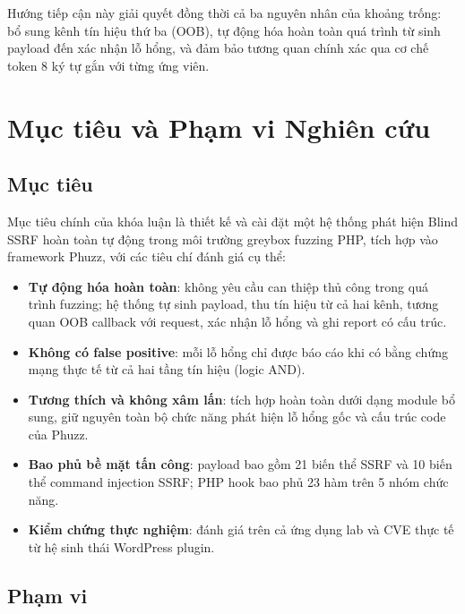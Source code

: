 Hướng tiếp cận này giải quyết đồng thời cả ba nguyên nhân của khoảng trống: bổ sung
kênh tín hiệu thứ ba (OOB), tự động hóa hoàn toàn quá trình từ sinh payload đến xác
nhận lỗ hổng, và đảm bảo tương quan chính xác qua cơ chế token 8 ký tự gắn với từng
ứng viên.

\section{Mục tiêu và Phạm vi Nghiên cứu}
\label{sec:objectives}

\subsection{Mục tiêu}

Mục tiêu chính của khóa luận là thiết kế và cài đặt một hệ thống phát hiện Blind
SSRF hoàn toàn tự động trong môi trường greybox fuzzing PHP, tích hợp vào framework
Phuzz, với các tiêu chí đánh giá cụ thể:

\begin{itemize}
    \item \textbf{Tự động hóa hoàn toàn}: không yêu cầu can thiệp thủ công trong quá
    trình fuzzing; hệ thống tự sinh payload, thu tín hiệu từ cả hai kênh, tương quan
    OOB callback với request, xác nhận lỗ hổng và ghi report có cấu trúc.
    \item \textbf{Không có false positive}: mỗi lỗ hổng chỉ được báo cáo khi có bằng
    chứng mạng thực tế từ cả hai tầng tín hiệu (logic AND).
    \item \textbf{Tương thích và không xâm lấn}: tích hợp hoàn toàn dưới dạng module
    bổ sung, giữ nguyên toàn bộ chức năng phát hiện lỗ hổng gốc và cấu trúc code của
    Phuzz.
    \item \textbf{Bao phủ bề mặt tấn công}: payload bao gồm 21 biến thể SSRF và 10
    biến thể command injection SSRF; PHP hook bao phủ 23 hàm trên 5 nhóm chức năng.
    \item \textbf{Kiểm chứng thực nghiệm}: đánh giá trên cả ứng dụng lab và CVE thực
    tế từ hệ sinh thái WordPress plugin.
\end{itemize}

\subsection{Phạm vi}

